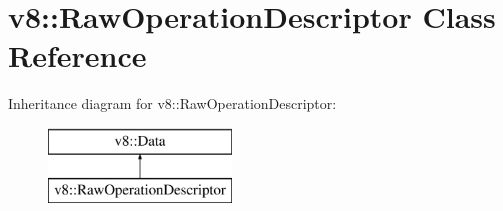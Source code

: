 \hypertarget{classv8_1_1_raw_operation_descriptor}{}\section{v8\+:\+:Raw\+Operation\+Descriptor Class Reference}
\label{classv8_1_1_raw_operation_descriptor}
Inheritance diagram for v8\+:\+:Raw\+Operation\+Descriptor\+:\begin{figure}[H]
\begin{center}
\leavevmode
\includegraphics[height=2.000000cm]{classv8_1_1_raw_operation_descriptor}
\end{center}
\end{figure}
